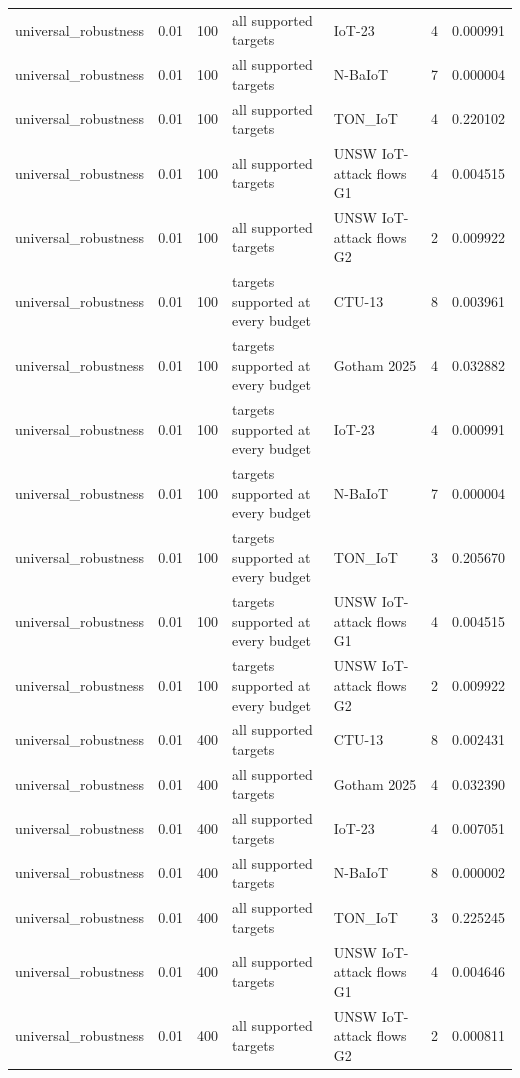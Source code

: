 \begin{tabular}{lllllll}
universal\_robustness & 0.01 & 100 & all supported targets & IoT-23 & 4 & 0.000991 \\
universal\_robustness & 0.01 & 100 & all supported targets & N-BaIoT & 7 & 0.000004 \\
universal\_robustness & 0.01 & 100 & all supported targets & TON\_IoT & 4 & 0.220102 \\
universal\_robustness & 0.01 & 100 & all supported targets & UNSW IoT-attack flows G1 & 4 & 0.004515 \\
universal\_robustness & 0.01 & 100 & all supported targets & UNSW IoT-attack flows G2 & 2 & 0.009922 \\
universal\_robustness & 0.01 & 100 & targets supported at every budget & CTU-13 & 8 & 0.003961 \\
universal\_robustness & 0.01 & 100 & targets supported at every budget & Gotham 2025 & 4 & 0.032882 \\
universal\_robustness & 0.01 & 100 & targets supported at every budget & IoT-23 & 4 & 0.000991 \\
universal\_robustness & 0.01 & 100 & targets supported at every budget & N-BaIoT & 7 & 0.000004 \\
universal\_robustness & 0.01 & 100 & targets supported at every budget & TON\_IoT & 3 & 0.205670 \\
universal\_robustness & 0.01 & 100 & targets supported at every budget & UNSW IoT-attack flows G1 & 4 & 0.004515 \\
universal\_robustness & 0.01 & 100 & targets supported at every budget & UNSW IoT-attack flows G2 & 2 & 0.009922 \\
universal\_robustness & 0.01 & 400 & all supported targets & CTU-13 & 8 & 0.002431 \\
universal\_robustness & 0.01 & 400 & all supported targets & Gotham 2025 & 4 & 0.032390 \\
universal\_robustness & 0.01 & 400 & all supported targets & IoT-23 & 4 & 0.007051 \\
universal\_robustness & 0.01 & 400 & all supported targets & N-BaIoT & 8 & 0.000002 \\
universal\_robustness & 0.01 & 400 & all supported targets & TON\_IoT & 3 & 0.225245 \\
universal\_robustness & 0.01 & 400 & all supported targets & UNSW IoT-attack flows G1 & 4 & 0.004646 \\
universal\_robustness & 0.01 & 400 & all supported targets & UNSW IoT-attack flows G2 & 2 & 0.000811 \\

\end{tabular}
